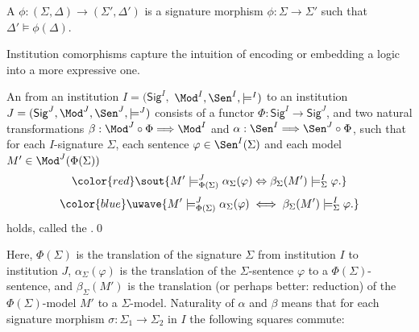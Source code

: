 \documentclass[10pt,fleqn,final]{scrreprt}
\newcommand{\Sig}{\mathsf{Sig}}
\newenvironment{definitions}[0]{\medskip }{}
\providecommand{\DIFadd}[1]{{\protect\color{blue}\uwave{#1}}} %
\providecommand{\DIFdel}[1]{{\protect\color{red}\sout{#1}}}                      %
\providecommand{\DIFaddbegin}{} %
\providecommand{\DIFaddend}{} %
\providecommand{\DIFdelbegin}{} %
\providecommand{\DIFdelend}{} %
\begin{document}
\begin{definitions}
\begin{definition}
\DIFaddend A  $\phi: (\Sigma, \Delta) \rightarrow (\Sigma',  \Delta')$ is 
   a signature morphism $\phi:\Sigma\rightarrow \Sigma'$ such that $\Delta'\models \phi(\Delta)$.
\DIFdelbegin %

\DIFdelend \DIFaddbegin \end{definition}
\DIFaddend \medskip

Institution comorphisms capture the intuition of encoding or embedding a logic into a more expressive one.

\begin{definition} An  from an institution $I = (\Sig^I,$ $ \Mod^I, \Sen^I, \models^I)$ to an institution $J=(\Sig^J, \Mod^J,\Sen^J, \models^J)$ consists of a functor $\Phi : \Sig^I \longrightarrow \Sig^J$, and
two natural transformations \DIFdelbegin \DIFdel{$\beta: \Mod^J \circ \Phi \Longrightarrow \Mod^I$
}\DIFdelend \DIFaddbegin \DIFadd{$\beta: \Mod^J \circ \Phi^{op} \Longrightarrow \Mod^I$
}\DIFaddend and $\alpha: \Sen^I \Longrightarrow \Sen^J \circ \Phi$, such that 
for each $I$-signature $\Sigma$, each sentence $\varphi\in\Sen^I(\Sigma)$ and each model \DIFdelbegin \DIFdel{$M'\in\Mod^J(\Phi(\Sigma))$
}\begin{displaymath}\DIFdel{ M'\models^{J}_{\Phi(\Sigma)}\alpha_{\Sigma}(\varphi) \Leftrightarrow
\beta_{\Sigma}(M')\models^I_{\Sigma}\varphi.
}\end{displaymath}
\DIFdelend \DIFaddbegin \DIFadd{$M'\in|\Mod^J(\Phi(\Sigma))|$
}\begin{equation*}\DIFadd{
  M'\models^{J}_{\Phi(\Sigma)}\alpha_{\Sigma}(\varphi)
\iff
  \beta_{\Sigma}(M')\models^I_{\Sigma}\varphi.
}\end{equation*}
\DIFaddend holds, called the .\DIFaddbegin \quad\DIFaddend \qed
\end{definition}

\noindent
Here, $\Phi(\Sigma)$ is the translation of the signature $\Sigma$ from
institution $I$ to institution $J$, $\alpha_{\Sigma}(\varphi)$ is the
translation of the $\Sigma$-sentence $\varphi$ to a
$\Phi(\Sigma)$-sentence, and $\beta_{\Sigma}(M')$ is the translation
(or perhaps better: reduction) of the $\Phi(\Sigma)$-model $M'$ to a
$\Sigma$-model. Naturality of $\alpha$ and $\beta$ means that for each
signature morphism $\sigma:\Sigma_1\rightarrow\Sigma_2$ in $I$ the following 
squares commute:
\DIFdelbegin %


\end{definitions}
\end{document}
